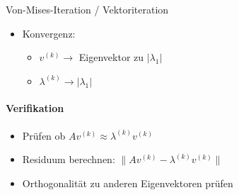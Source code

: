 \begin{KR}{Von-Mises-Iteration / Vektoriteration}
\begin{itemize}
    \item Konvergenz:
\begin{itemize}
    \item $v^{(k)} \to$ Eigenvektor zu $|\lambda_1|$
    \item $\lambda^{(k)} \to |\lambda_1|$
\end{itemize}
\end{itemize}

\paragraph{Verifikation}
\begin{itemize}
    \item Prüfen ob $Av^{(k)} \approx \lambda^{(k)}v^{(k)}$
    \item Residuum berechnen: $\|Av^{(k)} - \lambda^{(k)}v^{(k)}\|$
    \item Orthogonalität zu anderen Eigenvektoren prüfen
\end{itemize}
\end{KR}

